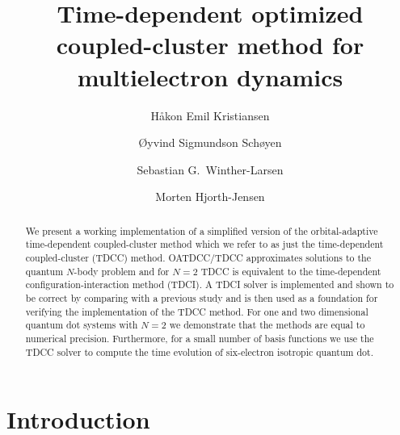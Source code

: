 \documentclass[aip,jcp,reprint,floatfix]{revtex4-1}
\begin{document}
\title{Time-dependent optimized coupled-cluster method for multielectron dynamics}

\author{Håkon Emil Kristiansen}

\author{\O yvind Sigmundson Sch\o yen}

\author{Sebastian G.~Winther-Larsen}


\author{Morten Hjorth-Jensen}



\begin{abstract}
We present a working implementation of a simplified version of the
orbital-adaptive time-dependent coupled-cluster method which we refer
to as just the time-dependent coupled-cluster (TDCC) method.
OATDCC/TDCC approximates solutions to the quantum $N$-body problem and
for $N=2$ TDCC is equivalent to the time-dependent
configuration-interaction method (TDCI).  A TDCI solver is implemented
and shown to be correct by comparing with a previous study and is then
used as a foundation for verifying the implementation of the TDCC
method. For one and two dimensional quantum dot systems with $N=2$ we
demonstrate that the methods are equal to numerical
precision. Furthermore, for a small number of basis functions we use
the TDCC solver to compute the time evolution of six-electron
isotropic quantum dot.
\end{abstract}


\maketitle




\section{Introduction}
\end{document}

